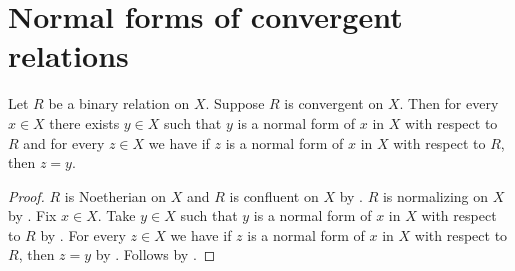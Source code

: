 



\section{Normal forms of convergent relations}

\begin{corollary}\label{convergent_on_unique_normal_form}
    Let $R$ be a binary relation on $X$.
    Suppose $R$ is convergent on $X$.
    Then for every $x\in X$ there exists $y\in X$ such that
        $y$ is a normal form of $x$ in $X$ with respect to $R$ and
        for every $z\in X$ we have if $z$ is a normal form of $x$ in $X$
            with respect to $R$, then $z=y$.
\end{corollary}
\begin{proof}
    $R$ is Noetherian on $X$ and $R$ is confluent on $X$
        by .
    $R$ is normalizing on $X$
        by .
    Fix $x\in X$.
    Take $y\in X$ such that
        $y$ is a normal form of $x$ in $X$ with respect to $R$
        by .
    For every $z\in X$ we have if $z$ is a normal form of $x$ in $X$
        with respect to $R$, then $z=y$
        by .
    Follows by \auto.
\end{proof}
